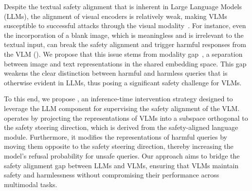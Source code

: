 Despite the textual safety alignment that is inherent in Large Language Models (LLMs), the alignment of visual encoders is relatively weak, making VLMs susceptible to successful attacks through the visual modality~\cite{bailey2023image,liang2024vl}.
For instance, even the incorporation of a blank image, which is meaningless and is irrelevant to the textual input, can break the safety alignment and trigger harmful responses from the VLM ().
We propose that this issue stems from modality gap~\cite{liang2022mind, schrodi2024two}, a separation between image and text representations in the shared embedding space. This gap weakens the clear distinction between harmful and harmless queries that is otherwise evident in LLMs, thus posing a significant safety challenge for VLMs.

To this end, we propose \MODEL, an inference-time intervention strategy designed to leverage the LLM component for supervising the safety alignment of the VLM. \MODEL operates by projecting the representations of VLMs into a subspace orthogonal to the safety steering direction, which is derived from the safety-aligned language module. Furthermore, it modifies the representations of harmful queries by moving them opposite to the safety steering direction, thereby increasing the model's refusal probability for unsafe queries.
Our approach aims to bridge the safety alignment gap between LLMs and VLMs, ensuring that VLMs maintain safety and harmlessness without compromising their performance across multimodal tasks.


